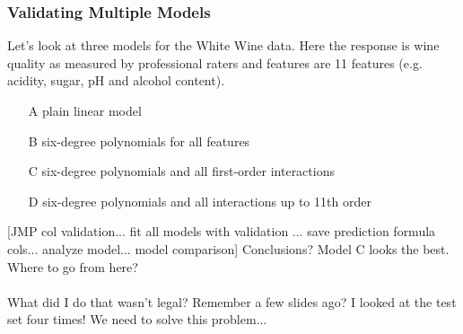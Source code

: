 \documentclass[handout]{beamer}
\begin{document}
\begin{frame}\frametitle{Validating Multiple Models}

Let's look at three models for the White Wine data. Here the response is wine quality as measured by professional raters and features are 11 features (e.g. acidity, sugar, pH and alcohol content).

\begin{enumerate}
\item[A] plain linear model \pause
\item[B] six-degree polynomials for all features \pause
\item[C] six-degree polynomials and all first-order interactions \pause
\item[D] six-degree polynomials and all interactions up to 11th order \pause
\end{enumerate}

[JMP col validation... fit all models with validation ... save prediction formula cols... analyze model... model comparison] Conclusions? \pause Model C looks the best. Where to go from here?\\~\\

What did I do that wasn't legal? Remember a few slides ago? I looked at the test set four times! We need to solve this problem...
	
\end{frame}
\end{document}
